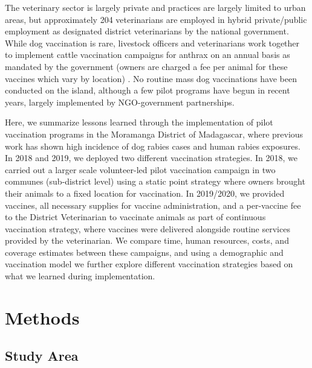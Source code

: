 \documentclass[tropicalmed,article,submit,moreauthors,pdftex]{mdpi}
\begin{document}
The veterinary sector is largely private and practices are largely
limited to urban areas, but approximately 204 veterinarians are employed
in hybrid private/public employment as designated district veterinarians
by the national government. While dog vaccination is rare, livestock
officers and veterinarians work together to implement cattle vaccination
campaigns for anthrax on an annual basis as mandated by the government
(owners are charged a fee per animal for these vaccines which vary by
location) \citep{mondiale2017evaluation}. No routine mass dog
vaccinations have been conducted on the island, although a few pilot
programs have begun in recent years, largely implemented by
NGO-government partnerships.

Here, we summarize lessons learned through the implementation of pilot
vaccination programs in the Moramanga District of Madagascar, where
previous work has shown high incidence of dog rabies cases and human
rabies exposures. In 2018 and 2019, we deployed two different
vaccination strategies. In 2018, we carried out a larger scale
volunteer-led pilot vaccination campaign in two communes (sub-district
level) using a static point strategy where owners brought their animals
to a fixed location for vaccination. In 2019/2020, we provided vaccines,
all necessary supplies for vaccine administration, and a per-vaccine fee
to the District Veterinarian to vaccinate animals as part of continuous
vaccination strategy, where vaccines were delivered alongside routine
services provided by the veterinarian. We compare time, human resources,
costs, and coverage estimates between these campaigns, and using a
demographic and vaccination model we further explore different
vaccination strategies based on what we learned during implementation.

\hypertarget{methods}{%
\section{Methods}\label{methods}}

\hypertarget{study-area}{%
\subsection{Study Area}\label{study-area}}
\end{document}

